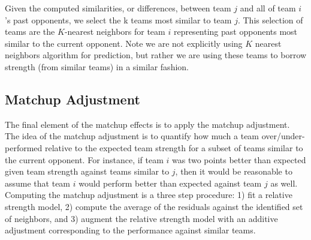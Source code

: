 \documentclass[letterpaper,12pt]{article}
\begin{document}
Given the computed similarities, or differences, between team $j$ and all of team $i$'s past opponents, we select the k teams most similar to team $j$. This selection of teams are the $K$-nearest neighbors for team $i$ representing past opponents most similar to the current opponent. Note we are not explicitly using $K$ nearest neighbors algorithm for prediction, but rather we are using these teams to borrow strength (from similar teams) in a similar fashion.

\subsection{Matchup Adjustment}
The final element of the matchup effects is to apply the matchup adjustment. The idea of the matchup adjustment is to quantify how much a team over/under-performed relative to the expected team strength for a subset of teams similar to the current opponent. For instance, if team $i$ was two points better than expected given team strength against teams similar to $j$, then it would be reasonable to assume that team $i$ would perform better than expected against team $j$ as well. Computing the matchup adjustment is a three step procedure: 1) fit a relative strength model, 2) compute the average of the residuals against the identified set of neighbors, and 3) augment the relative strength model with an additive adjustment corresponding to the performance against similar teams.
\end{document}
